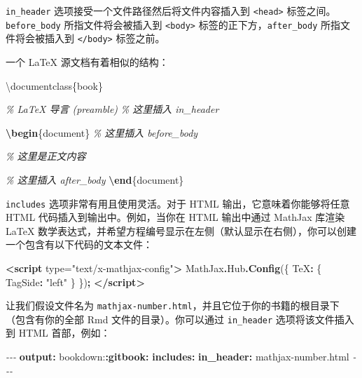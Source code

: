 \documentclass[
  12pt,
]{krantz}
\newenvironment{Shaded}{\begin{snugshade}}{\end{snugshade}}
\newcommand{\AttributeTok}[1]{\textcolor[rgb]{0.13,0.29,0.53}{#1}}
\newcommand{\BuiltInTok}[1]{#1}
\newcommand{\CommentTok}[1]{\textcolor[rgb]{0.56,0.35,0.01}{\textit{#1}}}
\newcommand{\DataTypeTok}[1]{\textcolor[rgb]{0.13,0.29,0.53}{#1}}
\newcommand{\ExtensionTok}[1]{#1}
\newcommand{\FunctionTok}[1]{\textcolor[rgb]{0.13,0.29,0.53}{\textbf{#1}}}
\newcommand{\KeywordTok}[1]{\textcolor[rgb]{0.13,0.29,0.53}{\textbf{#1}}}
\newcommand{\NormalTok}[1]{#1}
\newcommand{\OperatorTok}[1]{\textcolor[rgb]{0.81,0.36,0.00}{\textbf{#1}}}
\newcommand{\OtherTok}[1]{\textcolor[rgb]{0.56,0.35,0.01}{#1}}
\newcommand{\PreprocessorTok}[1]{\textcolor[rgb]{0.56,0.35,0.01}{\textit{#1}}}
\newcommand{\StringTok}[1]{\textcolor[rgb]{0.31,0.60,0.02}{#1}}
\theoremstyle{definition}
\theoremstyle{definition}
\theoremstyle{definition}
\theoremstyle{definition}
\theoremstyle{remark}
\begin{document}
\texttt{in\_header} 选项接受一个文件路径然后将文件内容插入到 \texttt{\textless{}head\textgreater{}} 标签之间。\texttt{before\_body} 所指文件将会被插入到 \texttt{\textless{}body\textgreater{}} 标签的正下方，\texttt{after\_body} 所指文件将会被插入到 \texttt{\textless{}/body\textgreater{}} 标签之前。

一个 LaTeX 源文档有着相似的结构：

\begin{Shaded}
\begin{Highlighting}[]
\BuiltInTok{\textbackslash{}documentclass}\NormalTok{\{}\ExtensionTok{book}\NormalTok{\}}

\CommentTok{\% LaTeX 导言 (preamble)}
\CommentTok{\% 这里插入 in\_header}

\KeywordTok{\textbackslash{}begin}\NormalTok{\{}\ExtensionTok{document}\NormalTok{\}}
\CommentTok{\% 这里插入 before\_body}

\CommentTok{\% 这里是正文内容}

\CommentTok{\% 这里插入 after\_body}
\KeywordTok{\textbackslash{}end}\NormalTok{\{}\ExtensionTok{document}\NormalTok{\}}
\end{Highlighting}
\end{Shaded}

\texttt{includes} 选项非常有用且使用灵活。对于 HTML 输出，它意味着你能够将任意 HTML 代码插入到输出中。例如，当你在 HTML 输出中通过 MathJax 库渲染 LaTeX 数学表达式，并希望方程编号显示在左侧（默认显示在右侧），你可以创建一个包含有以下代码的文本文件：

\begin{Shaded}
\begin{Highlighting}[]
\KeywordTok{\textless{}script}\OtherTok{ type=}\StringTok{"text/x{-}mathjax{-}config"}\KeywordTok{\textgreater{}}
\NormalTok{MathJax}\OperatorTok{.}\AttributeTok{Hub}\OperatorTok{.}\FunctionTok{Config}\NormalTok{(\{}
  \DataTypeTok{TeX}\OperatorTok{:}\NormalTok{ \{ }\DataTypeTok{TagSide}\OperatorTok{:} \StringTok{"left"}\NormalTok{ \}}
\NormalTok{\})}\OperatorTok{;}
\KeywordTok{\textless{}/script\textgreater{}}
\end{Highlighting}
\end{Shaded}

让我们假设文件名为 \texttt{mathjax-number.html}，并且它位于你的书籍的根目录下（包含有你的全部 Rmd 文件的目录）。你可以通过 \texttt{in\_header} 选项将该文件插入到 HTML 首部，例如：

\begin{Shaded}
\begin{Highlighting}[]
\PreprocessorTok{{-}{-}{-}}
\FunctionTok{output}\KeywordTok{:}
\AttributeTok{  bookdown:}\FunctionTok{:gitbook}\KeywordTok{:}
\AttributeTok{    }\FunctionTok{includes}\KeywordTok{:}
\AttributeTok{      }\FunctionTok{in\_header}\KeywordTok{:}\AttributeTok{ mathjax{-}number.html}
\PreprocessorTok{{-}{-}{-}}
\end{Highlighting}
\end{Shaded}
\end{document}

